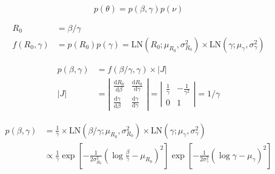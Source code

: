 \documentclass{article}
\begin{document}
 \\

\[p(\theta) = p(\beta,\gamma)p(\nu)\]

\begin{align*}
R_0 &= \beta / \gamma \\
f(R_0,\gamma) &= p(R_0)p(\gamma) = \mbox{LN}(R_0;\mu_{R_0},\sigma^2_{R_0})\times\mbox{LN}(\gamma;\mu_{\gamma},\sigma^2_{\gamma})
\end{align*}

\begin{align*}
p(\beta,\gamma) &= f(\beta / \gamma, \gamma)\times|J| \\
|J| &= \left|\begin{array}{cc}
\frac{\mbox{d}R_0}{\mbox{d}\beta} & \frac{\mbox{d}R_0}{\mbox{d}\gamma} \\
\frac{\mbox{d}\gamma}{\mbox{d}\beta} & \frac{\mbox{d}\gamma}{\mbox{d}\gamma}
\end{array}
\right| = \left|\begin{array}{cc}
\frac{1}{\gamma} & -\frac{1}{\gamma^2} \\
0 & 1
\end{array}
\right| = 1 / \gamma
\end{align*}

\begin{align*}
p(\beta,\gamma) &= \frac{1}{\gamma}\times\mbox{LN}(\beta/\gamma;\mu_{R_0},\sigma^2_{R_0})\times\mbox{LN}(\gamma;\mu_{\gamma},\sigma^2_{\gamma}) \\
 &\propto \frac{1}{\gamma}\exp[-\frac{1}{2\sigma^2_{R_0}}(\log\frac{\beta}{\gamma} - \mu_{R_0})^2]\exp[-\frac{1}{2\sigma^2_{\gamma}}(\log\gamma - \mu_{\gamma})^2]
\end{align*}
\end{document}
